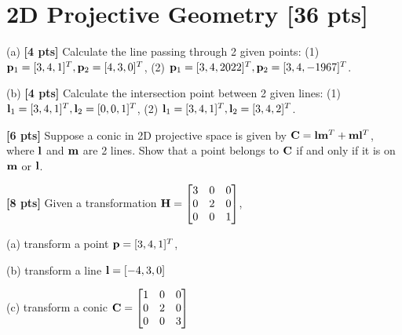 \documentclass[11pt,addpoints,answers]{exam}
\numberwithin{equation}{section} %
\numberwithin{figure}{section} %
\numberwithin{table}{section} %
\begin{document}
\clearpage

\section{2D Projective Geometry  [36 pts]}
\begin{questions}

\question (a) \textbf{[4 pts]} Calculate the line passing through 2 given points: (1) $\mathbf{p}_1= [3,4,1]^T, \mathbf{p}_2 = [4,3,0]^T$, (2) $\mathbf{p}_1= [3,4,2022]^T, \mathbf{p}_2 = [3,4,-1967]^T$.

(b) \textbf{[4 pts]} Calculate the intersection point between 2 given lines: (1) $\mathbf{l}_1 = [3,4,1]^T, \mathbf{l}_2 = [0,0,1]^T $, (2) $\mathbf{l}_1= [3,4,1]^T, \mathbf{l}_2 = [3,4,2]^T$.

\begin{tcolorbox}[height fill, width=\textwidth, blank, borderline={0.5pt}{-2pt},halign=left, valign=top, nobeforeafter, size=normal]


\end{tcolorbox}

\question \textbf{[6 pts]} Suppose a conic in 2D projective space is given by $\mathbf{C} = \mathbf{l}\mathbf{m}^T + \mathbf{m}\mathbf{l}^T$, where $\mathbf{l}$ and $\mathbf{m}$ are 2 lines. Show that a point belongs to $\mathbf{C}$ if and only if it is on $\mathbf{m}$ or $\mathbf{l}$.

\begin{tcolorbox}[height fill, width=\textwidth, blank, borderline={0.5pt}{-2pt},halign=left, valign=top, nobeforeafter, size=normal]

\end{tcolorbox}

\question \textbf{[8 pts]} Given a transformation $\mathbf{H} = \begin{bmatrix}
                 3 & 0 & 0  \\
                 0 & 2 & 0  \\
                 0 & 0 & 1  \\
                \end{bmatrix}$,

(a) transform a point $\mathbf{p} = [3,4,1]^T$,

(b) transform a line $\mathbf{l} = [-4, 3, 0]$

(c) transform a conic $\mathbf{C} = \begin{bmatrix}
                 1 & 0 & 0  \\
                 0 & 2 & 0  \\
                 0 & 0 & 3  \\
                \end{bmatrix}$


\end{questions}
\end{document}
